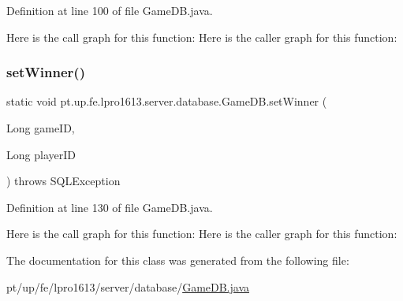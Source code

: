 Definition at line 100 of file Game\+D\+B.\+java.

Here is the call graph for this function\+:
Here is the caller graph for this function\+:
\hypertarget{classpt_1_1up_1_1fe_1_1lpro1613_1_1server_1_1database_1_1_game_d_b_a30f4664442da6b7ae80b1821aaa195fa}{}\label{classpt_1_1up_1_1fe_1_1lpro1613_1_1server_1_1database_1_1_game_d_b_a30f4664442da6b7ae80b1821aaa195fa} 
\subsubsection{\texorpdfstring{set\+Winner()}{setWinner()}}
{\footnotesize\ttfamily static void pt.\+up.\+fe.\+lpro1613.\+server.\+database.\+Game\+D\+B.\+set\+Winner (\begin{DoxyParamCaption}\item[{Long}]{game\+ID,  }\item[{Long}]{player\+ID }\end{DoxyParamCaption}) throws S\+Q\+L\+Exception\hspace{0.3cm}{\ttfamily [static]}}



Definition at line 130 of file Game\+D\+B.\+java.

Here is the call graph for this function\+:
Here is the caller graph for this function\+:


The documentation for this class was generated from the following file\+:\begin{DoxyCompactItemize}
\item 
pt/up/fe/lpro1613/server/database/\hyperlink{_game_d_b_8java}{Game\+D\+B.\+java}\end{DoxyCompactItemize}
